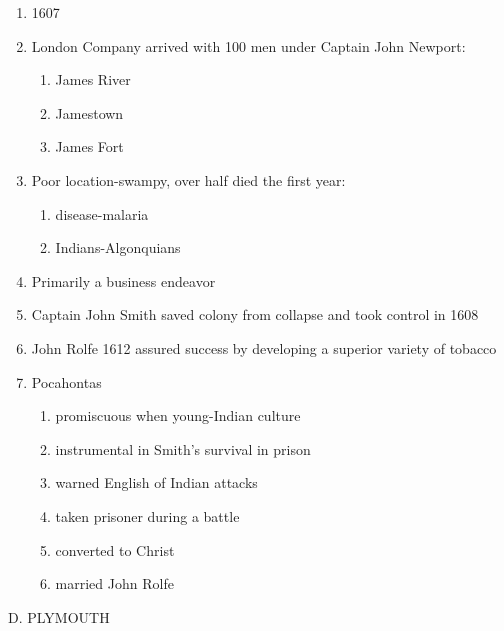 \documentclass{article}
\begin{document}
\begin{enumerate}
    \item 1607
    \item London Company arrived with 100 men under Captain John Newport:
        \begin{enumerate}
            \item James River
            \item Jamestown
            \item James Fort
        \end{enumerate}
    \item Poor location-swampy, over half died the first year:
        \begin{enumerate}
            \item disease-malaria
            \item Indians-Algonquians
        \end{enumerate}
    \item Primarily a business endeavor
    \item Captain John Smith saved colony from collapse and took control in 1608
    \item John Rolfe 1612 assured success by developing a superior variety of tobacco
    \item Pocahontas
        \begin{enumerate}
            \item promiscuous when young-Indian culture
            \item instrumental in Smith’s survival in prison
            \item warned English of Indian attacks
            \item taken prisoner during a battle
            \item converted to Christ
            \item married John Rolfe
        \end{enumerate}
\end{enumerate}

\noindent D. PLYMOUTH
\end{document}
